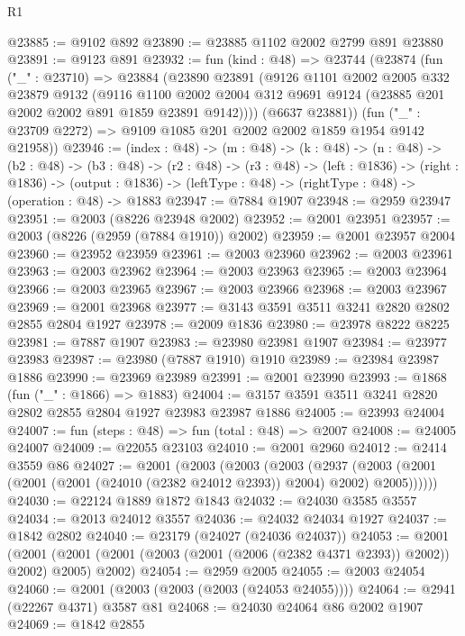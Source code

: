 \begin{lexlean}{R1}
\begin{coremodule}
@23885 := @9102 @892
@23890 := @23885 @1102 @2002 @2799 @891 @23880
@23891 := @9123 @891
@23932 := fun (kind : @48) =>
  @23744
    (@23874
      (fun ("_" : @23710) =>
      @23884
        (@23890
          @23891
          (@9126
            @1101
            @2002
            @2005
            @332
            @23879
            @9132
            (@9116
              @1100
              @2002
              @2004
              @312
              @9691
              @9124
              (@23885 @201 @2002 @2002 @891 @1859 @23891 @9142))))
        (@6637 @23881))
      (fun ("_" : @23709 @2272) => @9109 @1085 @201 @2002 @2002 @1859 @1954 @9142 @21958))
@23946 := (index : @48) ->
  (m : @48) ->
  (k : @48) ->
  (n : @48) ->
  (b2 : @48) ->
  (b3 : @48) ->
  (r2 : @48) ->
  (r3 : @48) ->
  (left : @1836) ->
  (right : @1836) ->
  (output : @1836) -> (leftType : @48) -> (rightType : @48) -> (operation : @48) -> @1883
@23947 := @7884 @1907
@23948 := @2959 @23947
@23951 := @2003 (@8226 @23948 @2002)
@23952 := @2001 @23951
@23957 := @2003 (@8226 (@2959 (@7884 @1910)) @2002)
@23959 := @2001 @23957 @2004
@23960 := @23952 @23959
@23961 := @2003 @23960
@23962 := @2003 @23961
@23963 := @2003 @23962
@23964 := @2003 @23963
@23965 := @2003 @23964
@23966 := @2003 @23965
@23967 := @2003 @23966
@23968 := @2003 @23967
@23969 := @2001 @23968
@23977 := @3143 @3591 @3511 @3241 @2820 @2802 @2855 @2804 @1927
@23978 := @2009 @1836
@23980 := @23978 @8222 @8225
@23981 := @7887 @1907
@23983 := @23980 @23981 @1907
@23984 := @23977 @23983
@23987 := @23980 (@7887 @1910) @1910
@23989 := @23984 @23987 @1886
@23990 := @23969 @23989
@23991 := @2001 @23990
@23993 := @1868 (fun ("_" : @1866) => @1883)
@24004 := @3157 @3591 @3511 @3241 @2820 @2802 @2855 @2804 @1927 @23983 @23987 @1886
@24005 := @23993 @24004
@24007 := fun (steps : @48) => fun (total : @48) => @2007
@24008 := @24005 @24007
@24009 := @22055 @23103
@24010 := @2001 @2960
@24012 := @2414 @3559 @86
@24027 := @2001
    (@2003
      (@2003
        (@2003
          (@2937 (@2003 (@2001 (@2001 (@2001 (@24010 (@2382 @24012 @2393)) @2004) @2002) @2005))))))
@24030 := @22124 @1889 @1872 @1843
@24032 := @24030 @3585 @3557
@24034 := @2013 @24012 @3557
@24036 := @24032 @24034 @1927
@24037 := @1842 @2802
@24040 := @23179 (@24027 (@24036 @24037))
@24053 := @2001
    (@2001 (@2001 (@2001 (@2003 (@2001 (@2006 (@2382 @4371 @2393)) @2002)) @2002) @2005) @2002)
@24054 := @2959 @2005
@24055 := @2003 @24054
@24060 := @2001 (@2003 (@2003 (@2003 (@24053 @24055))))
@24064 := @2941 (@22267 @4371) @3587 @81
@24068 := @24030 @24064 @86 @2002 @1907
@24069 := @1842 @2855

\end{coremodule}
\end{lexlean}
